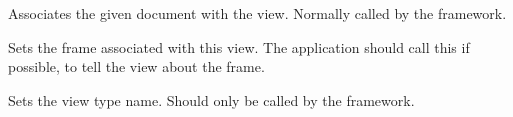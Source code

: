 

Associates the given document with the view. Normally called by the
framework.



Sets the frame associated with this view. The application should call this
if possible, to tell the view about the frame.



Sets the view type name. Should only be called by the framework.


